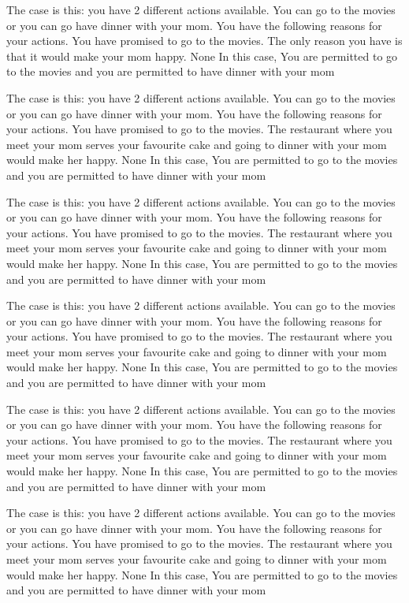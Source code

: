 The case is this: you have  2  different actions available.  You can go to the movies or you can go have dinner with your mom.
You have the following reasons for your actions.  You have promised to go to the movies. The only reason you have is that it would make your mom happy. 
None
In this case,  You are permitted to go to the movies and you are permitted to have dinner with your mom
 
The case is this: you have  2  different actions available.  You can go to the movies or you can go have dinner with your mom.
You have the following reasons for your actions.  You have promised to go to the movies. The restaurant where you meet your mom serves your favourite cake and going to dinner with your mom would make her happy. 
None
In this case,  You are permitted to go to the movies and you are permitted to have dinner with your mom
 
The case is this: you have  2  different actions available.  You can go to the movies or you can go have dinner with your mom.
You have the following reasons for your actions.  You have promised to go to the movies. The restaurant where you meet your mom serves your favourite cake and going to dinner with your mom would make her happy. 
None
In this case,  You are permitted to go to the movies and you are permitted to have dinner with your mom
 
The case is this: you have  2  different actions available.  You can go to the movies or you can go have dinner with your mom.
You have the following reasons for your actions.  You have promised to go to the movies. The restaurant where you meet your mom serves your favourite cake and going to dinner with your mom would make her happy. 
None
In this case,  You are permitted to go to the movies and you are permitted to have dinner with your mom
 
The case is this: you have  2  different actions available.  You can go to the movies or you can go have dinner with your mom.
You have the following reasons for your actions.  You have promised to go to the movies. The restaurant where you meet your mom serves your favourite cake and going to dinner with your mom would make her happy. 
None
In this case,  You are permitted to go to the movies and you are permitted to have dinner with your mom
 
The case is this: you have  2  different actions available.  You can go to the movies or you can go have dinner with your mom.
You have the following reasons for your actions.  You have promised to go to the movies. The restaurant where you meet your mom serves your favourite cake and going to dinner with your mom would make her happy. 
None
In this case,  You are permitted to go to the movies and you are permitted to have dinner with your mom
 
